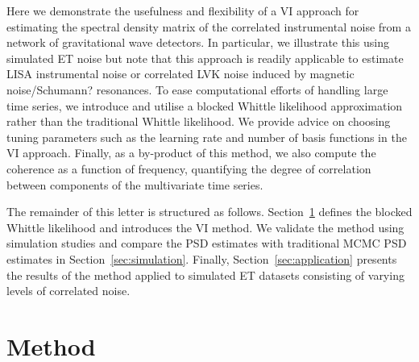 \documentclass[%
 reprint,
 amsmath,amssymb,
 aps,
]{revtex4-2}
\begin{document}
Here we demonstrate the usefulness and flexibility of a VI approach for estimating the spectral density matrix of the correlated instrumental noise from a  network of gravitational wave detectors.
In particular, we illustrate this using simulated ET noise but note that this approach is readily applicable to estimate  LISA instrumental noise or correlated LVK noise induced by magnetic noise/Schumann? resonances.
To ease computational efforts of handling large time series, we introduce and utilise a blocked Whittle likelihood approximation rather than the traditional Whittle likelihood. We provide advice on choosing tuning parameters such as the learning rate and number of basis functions in the VI approach. Finally,
as a by-product of this method, we also compute the coherence as a function of frequency, quantifying the degree of correlation between components of the multivariate time series. 


The remainder of this letter is structured as follows. 
Section~\ref{sec:method} defines the blocked Whittle likelihood and introduces the \ac{VI} method. 
We validate the method using simulation studies and compare the \ac{PSD} estimates with traditional  \ac{MCMC} \ac{PSD} estimates in Section~\ref{sec:simulation}.
Finally, Section~\ref{sec:application} presents the results of the method applied to simulated \ac{ET} datasets consisting of varying levels of correlated noise. 






\section{Method}
\label{sec:method}
\end{document}
